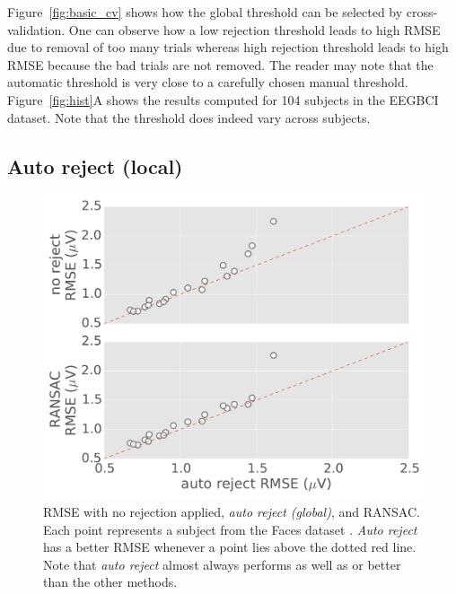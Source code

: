 
Figure~\ref{fig:basic_cv} shows how the global threshold can be selected by cross-validation. One can observe how a low rejection threshold leads to high RMSE due to removal of too many trials whereas high rejection threshold leads to high RMSE because the bad trials are not removed. The reader may note that the automatic threshold is very close to a carefully chosen manual threshold. Figure~\ref{fig:hist}A shows the results computed for 104 subjects in the EEGBCI dataset. Note that the threshold does indeed vary across subjects.

\subsection{Auto reject (local)}

\begin{figure}[t]
	\begin{center}
	\includegraphics[width=0.7\linewidth]{figures/figure5.pdf}
    \end{center}
    \caption{RMSE with no rejection applied, \emph{auto reject (global)}, and RANSAC. Each point represents a subject from the Faces dataset \citep{wakeman2015multi}. \emph{Auto reject} has a better RMSE whenever a point lies above the dotted red line. Note that \emph{auto reject} almost always performs as well as or better than the other methods.}
    \label{fig:rmse_comparison}
\end{figure}

